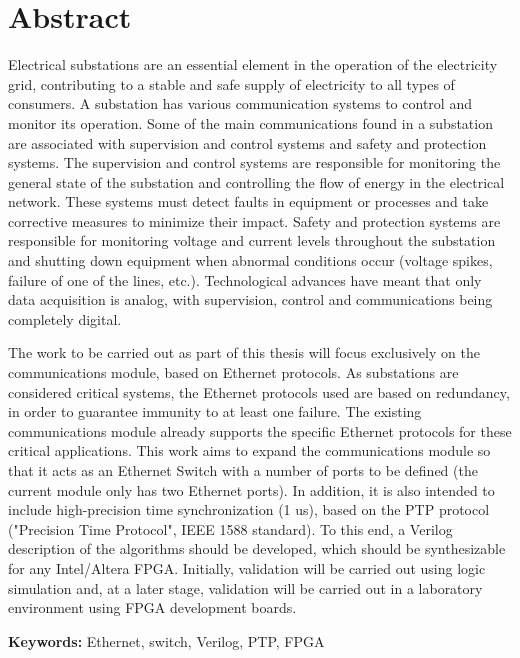 
\section*{Abstract}


Electrical substations are an essential element in the operation of the electricity grid, contributing to a stable and safe supply of electricity to all types of consumers. 
A substation has various communication systems to control and monitor its operation. Some of the main communications found in a substation are associated with supervision and control systems and safety and protection systems.  
The supervision and control systems are responsible for monitoring the general state of the substation and controlling the flow of energy in the electrical network. These systems must detect faults in equipment or processes and take corrective measures to minimize their impact. Safety and protection systems are responsible for monitoring voltage and current levels throughout the substation and shutting down equipment when abnormal conditions occur (voltage spikes, failure of one of the lines, etc.). 
Technological advances have meant that only data acquisition is analog, with supervision, control and communications being completely digital. \par The work to be carried out as part of this thesis will focus exclusively on the communications module, based on Ethernet protocols. 
As substations are considered critical systems, the Ethernet protocols used are based on redundancy, in order to guarantee immunity to at least one failure. The existing communications module already supports the specific Ethernet protocols for these critical applications. 
This work aims to expand the communications module so that it acts as an Ethernet Switch with a number of ports to be defined (the current module only has two Ethernet ports). In addition, it is also intended to include high-precision time synchronization (1 us), based on the PTP protocol ("Precision Time Protocol", IEEE 1588 standard). 
To this end, a Verilog description of the algorithms should be developed, which should be synthesizable for any Intel/Altera FPGA. 
Initially, validation will be carried out using logic simulation and, at a later stage, validation will be carried out in a laboratory environment using FPGA development boards.


\vfill

\textbf{\Large Keywords:} Ethernet, switch, Verilog, PTP, FPGA


